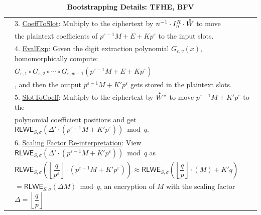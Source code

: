\begin{table}[h]
\begin{tabular}{|c||l|}
&3. \underline{\textsf{CoeffToSlot}}: Multiply to the ciphertext by $n^{-1}\cdot I_n^R \cdot \hathat W$ to move\\
& \text{ } \text{ } the plaintext coefficients of $p^{\varepsilon-1} M + E + Kp^\varepsilon$ to the input slots.\\
&4. \underline{\textsf{EvalExp}}: Given the digit extraction polynomial $G_{\varepsilon, v}(x)$, homomorphically compute:\\
&\text{ } \text{ } $G_{\varepsilon, 1} \circ G_{\varepsilon, 2}\circ \cdots \circ G_{\varepsilon, w-1} (p^{\varepsilon-1} M + E + Kp^\varepsilon)$\\
&\text{ } \text{ }, and then the output $p^{\varepsilon-1}M + K'p^\varepsilon$ gets stored in the plaintext slots.\\
&5. \underline{\textsf{SlotToCoeff}}: Multiply to the ciphertext by $\hathat W^*$ to move $p^{\varepsilon-1}M + K'p^\varepsilon$ to the \\
&\text{ } \text{ } polynomial coefficient positions and get $\textsf{RLWE}_{S, \sigma}(\Delta'\cdot(p^{\varepsilon-1}M + K'p^\varepsilon)) \bmod q$.\\
&6. \underline{Scaling Factor Re-interpretation}: View $\textsf{RLWE}_{S, \sigma}(\Delta'\cdot(p^{\varepsilon-1}M + K'p^\varepsilon)) \bmod q$ as\\
&\text{ } \text{ } $\textsf{RLWE}_{S, \sigma}\left(\left\lfloor\dfrac{q}{p^\varepsilon}\right\rfloor\cdot(p^{\varepsilon-1}M + K'p^\varepsilon)\right) \approx \textsf{RLWE}_{S, \sigma}\left(\left\lfloor\dfrac{q}{p}\right\rfloor\cdot(M) + K'q\right)$\\
&\text{ } \text{ }$ = \textsf{RLWE}_{S, \sigma}(\Delta M) \bmod q$, an encryption of $M$ with the scaling factor $\Delta = \left\lfloor\dfrac{q}{p}\right\rfloor$\\
\hline
\end{tabular}
\caption{\textbf{Bootstrapping Details: TFHE, BFV}}
\end{table}

